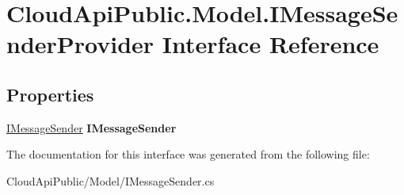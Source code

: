 \hypertarget{interface_cloud_api_public_1_1_model_1_1_i_message_sender_provider}{\section{Cloud\-Api\-Public.\-Model.\-I\-Message\-Sender\-Provider Interface Reference}
\label{interface_cloud_api_public_1_1_model_1_1_i_message_sender_provider}
}
\subsection*{Properties}
\begin{DoxyCompactItemize}
\item 
\hypertarget{interface_cloud_api_public_1_1_model_1_1_i_message_sender_provider_a3c439fda844fe463bf1dc319b8108c30}{\hyperlink{interface_cloud_api_public_1_1_model_1_1_i_message_sender}{I\-Message\-Sender} {\bfseries I\-Message\-Sender}}\label{interface_cloud_api_public_1_1_model_1_1_i_message_sender_provider_a3c439fda844fe463bf1dc319b8108c30}

\end{DoxyCompactItemize}


The documentation for this interface was generated from the following file\-:\begin{DoxyCompactItemize}
\item 
Cloud\-Api\-Public/\-Model/I\-Message\-Sender.\-cs\end{DoxyCompactItemize}
